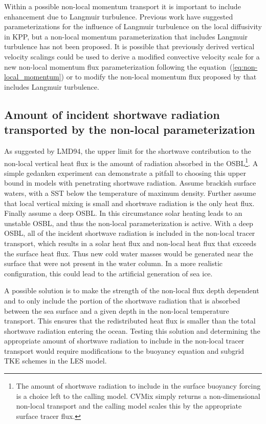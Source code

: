 \documentclass[preprint,12pt,authoryear]{agujournal}
\begin{document}
Within a possible non-local momentum transport it is important to include enhancement due to Langmuir turbulence.  Previous work \citep{McWilliams2000,Li:2015gv,Reichl:2016db} have suggested parameterizations for the influence of Langmuir turbulence on the local diffusivity in KPP, but a non-local momentum parameterization that includes Langmuir turbulence has not been proposed.  It is possible that previously derived vertical velocity scalings \citep[\textit{e.g.}, ][]{McWilliams2000,van2012form} could be used to derive a modified convective velocity scale for a new non-local momentum flux parameterization following the equation~(\ref{eq:non-local_momentum}) or to modify the non-local momentum flux proposed by \cite{Smyth2002} that includes Langmuir turbulence.

\subsection{Amount of incident shortwave radiation transported by the non-local parameterization}
\label{shortWaveExperiment}
As suggested by LMD94, the upper limit for the shortwave contribution to the non-local vertical heat flux is the amount of radiation absorbed in the OSBL\footnote{The amount of shortwave radiation to include in the surface buoyancy forcing is a choice left to the calling model.  CVMix simply returns a non-dimensional non-local transport and the calling model scales this by the appropriate surface tracer flux.}.  A simple gedanken experiment can demonstrate a pitfall to choosing this upper bound in models with penetrating shortwave radiation.  Assume brackish surface waters, with a SST below the temperature of maximum density.  Further assume that local vertical mixing is small and shortwave radiation is the only heat flux.  Finally assume a deep OSBL.  In this circumstance solar heating leads to an unstable OSBL, and thus the non-local parameterization is active.  With a deep OSBL, all of the incident shortwave radiation is included in the non-local tracer transport, which results in a solar heat flux and non-local heat flux that exceeds the surface heat flux.  Thus new cold water masses would be generated near the surface that were not present in the water column.  In a more realistic configuration, this could lead to the artificial generation of sea ice.

A possible solution is to make the strength of the non-local flux depth dependent and to only include the portion of the shortwave radiation that is absorbed between the sea surface and a given depth in the non-local temperature transport.  This ensures that the redistributed heat flux is smaller than the total shortwave radiation entering the ocean.  Testing this solution and determining the appropriate amount of shortwave radiation to include in the non-local tracer transport would require modifications to the buoyancy equation and subgrid TKE schemes in the LES model.
\end{document}
